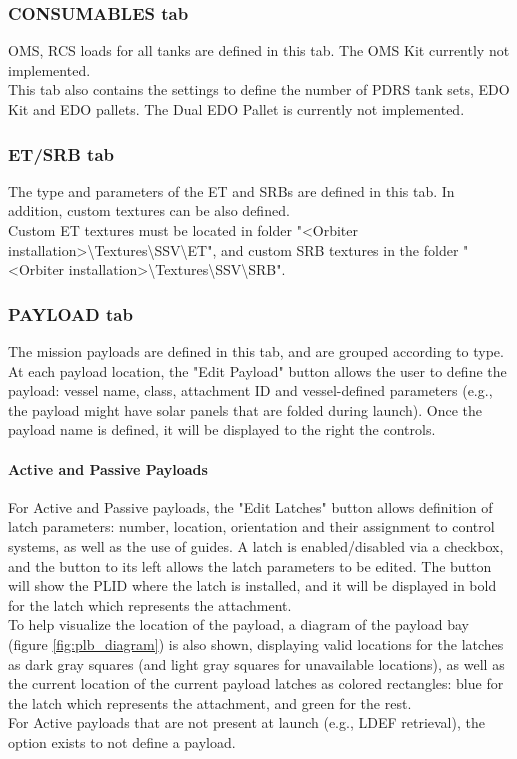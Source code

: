 \documentclass[Space_Shuttle_Vessel_Manual.tex]{subfiles}
\begin{document}
\begin{multicols*}{2}
\subsubsection{CONSUMABLES tab}
OMS, RCS loads for all tanks are defined in this tab. The OMS Kit currently not implemented.\\
This tab also contains the settings to define the number of PDRS tank sets, EDO Kit and EDO pallets. The Dual EDO Pallet is currently not implemented.


\subsubsection{ET/SRB tab}
The type and parameters of the ET and SRBs are defined in this tab. In addition, custom textures can be also defined.\\
Custom ET textures must be located in folder "<Orbiter installation>\textbackslash Textures\textbackslash SSV\textbackslash ET", and custom SRB textures in the folder "<Orbiter installation>\textbackslash Textures\textbackslash SSV\textbackslash SRB".


\subsubsection{PAYLOAD tab}
The mission payloads are defined in this tab, and are grouped according to type.\\
At each payload location, the "Edit Payload" button allows the user to define the payload: vessel name, class, attachment ID and vessel-defined parameters (e.g., the payload might have solar panels that are folded during launch). Once the payload name is defined, it will be displayed to the right the controls.

\paragraph{Active and Passive Payloads}
For Active and Passive payloads, the "Edit Latches" button allows definition of latch parameters: number, location, orientation and their assignment to control systems, as well as the use of guides. A latch is enabled/disabled via a checkbox, and the button to its left allows the latch parameters to be edited. The button will show the PLID where the latch is installed, and it will be displayed in bold for the latch which represents the attachment.\\
To help visualize the location of the payload, a diagram of the payload bay (figure \ref{fig:plb_diagram}) is also shown, displaying valid locations for the latches as dark gray squares (and light gray squares for unavailable locations), as well as the current location of the current payload latches as colored rectangles: blue for the latch which represents the attachment, and green for the rest.\\
For Active payloads that are not present at launch (e.g., LDEF retrieval), the option exists to not define a payload.


\end{multicols*}
\end{document}
